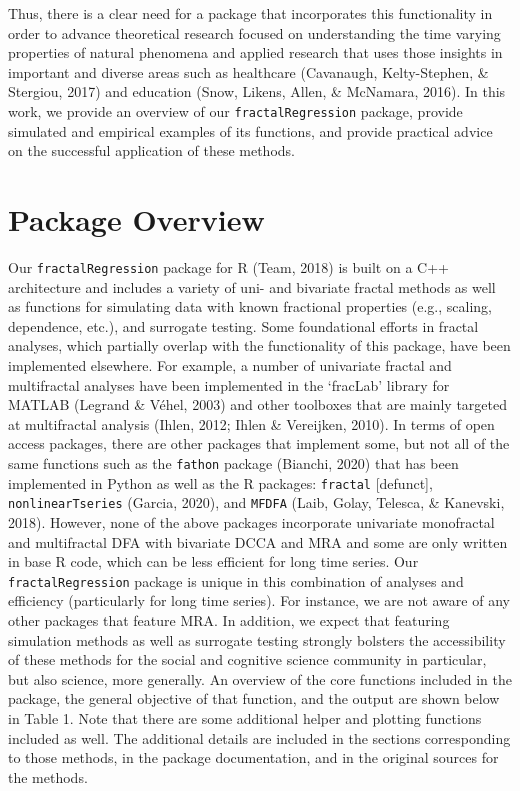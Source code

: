 \documentclass[
  man]{apa6}
\begin{document}
Thus, there is a clear need for a package that incorporates this
functionality in order to advance theoretical research focused on
understanding the time varying properties of natural phenomena and
applied research that uses those insights in important and diverse areas
such as healthcare (Cavanaugh, Kelty-Stephen, \& Stergiou, 2017) and education (Snow, Likens, Allen, \& McNamara, 2016). In this
work, we provide an overview of our \texttt{fractalRegression} package, provide
simulated and empirical examples of its functions, and provide practical
advice on the successful application of these methods.

\hypertarget{package-overview}{%
\section{Package Overview}\label{package-overview}}

Our \texttt{fractalRegression} package for R
(Team, 2018) is built on a C++
architecture and includes a variety of uni- and bivariate fractal
methods as well as functions for simulating data with known fractional
properties (e.g., scaling, dependence, etc.), and surrogate testing.
Some foundational efforts in fractal analyses, which partially overlap
with the functionality of this package, have been implemented elsewhere.
For example, a number of univariate fractal and multifractal analyses
have been implemented in the `fracLab' library for MATLAB (Legrand \& Véhel, 2003)
and other toolboxes that are mainly targeted at multifractal analysis
(Ihlen, 2012; Ihlen \& Vereijken, 2010). In terms of
open access packages, there are other packages that implement some, but
not all of the same functions such as the \texttt{fathon} package
(Bianchi, 2020) that has been implemented in Python as well as the R
packages: \texttt{fractal} {[}defunct{]}, \texttt{nonlinearTseries}
(Garcia, 2020), and \texttt{MFDFA}
(Laib, Golay, Telesca, \& Kanevski, 2018). However, none of the above packages
incorporate univariate monofractal and multifractal DFA with bivariate
DCCA and MRA and some are only written in base R code, which can be less
efficient for long time series. Our \texttt{fractalRegression} package is
unique in this combination of analyses and efficiency (particularly for
long time series). For instance, we are not aware of any other packages
that feature MRA. In addition, we expect that featuring simulation
methods as well as surrogate testing strongly bolsters the accessibility
of these methods for the social and cognitive science community in
particular, but also science, more generally. An overview of the core
functions included in the package, the general objective of that
function, and the output are shown below in Table 1. Note that there are
some additional helper and plotting functions included as well. The
additional details are included in the sections corresponding to those
methods, in the package documentation, and in the original sources for
the methods.
\end{document}
